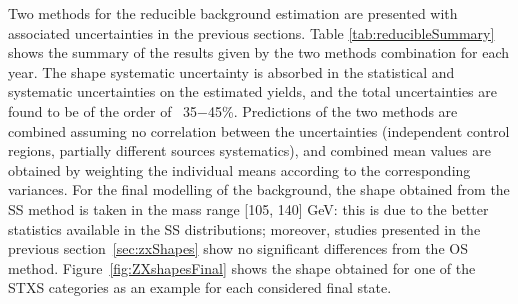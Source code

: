 Two methods for the reducible background estimation are presented with associated uncertainties in the previous sections. Table \ref{tab:reducibleSummary} shows the summary of the results given by the two methods combination for each year. 
The shape systematic uncertainty is absorbed in the statistical and systematic uncertainties on the estimated yields, and the total uncertainties are found to be of the order of ~35$-$45\%. 
Predictions of the two methods are combined assuming no correlation between the uncertainties (independent control regions, partially different sources systematics), 
and combined mean values are obtained by weighting the individual means according to the corresponding variances. 
For the final modelling of the background, the shape obtained from the SS method is taken 
in the mass range [105, 140] GeV: this is due to the better statistics available in the SS distributions; 
moreover, studies presented in the previous section~\ref{sec:zxShapes} show no significant differences from the OS method. 
Figure~\ref{fig:ZXshapesFinal} shows the shape obtained for one of the STXS categories as an example for each considered final state. 

